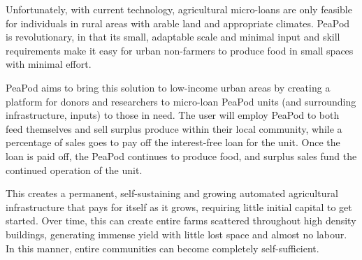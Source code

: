 \documentclass{report}
\begin{document}
Unfortunately, with current technology, agricultural micro-loans are only feasible for individuals in rural areas with arable land and appropriate climates. PeaPod is revolutionary, in that its small, adaptable scale and minimal input and skill requirements make it easy for urban non-farmers to produce food in small spaces with minimal effort.

PeaPod aims to bring this solution to low-income urban areas by creating a platform for donors and researchers to micro-loan PeaPod units (and surrounding infrastructure, inputs) to those in need. The user will employ PeaPod to both feed themselves and sell surplus produce within their local community, while a percentage of sales goes to pay off the interest-free loan for the unit. Once the loan is paid off, the PeaPod continues to produce food, and surplus sales fund the continued operation of the unit. 

This creates a permanent, self-sustaining and growing automated agricultural infrastructure that pays for itself as it grows, requiring little initial capital to get started. Over time, this can create entire farms scattered throughout high density buildings, generating immense yield with little lost space and almost no labour. In this manner, entire communities can become completely self-sufficient.



% 
% 
\end{document}
